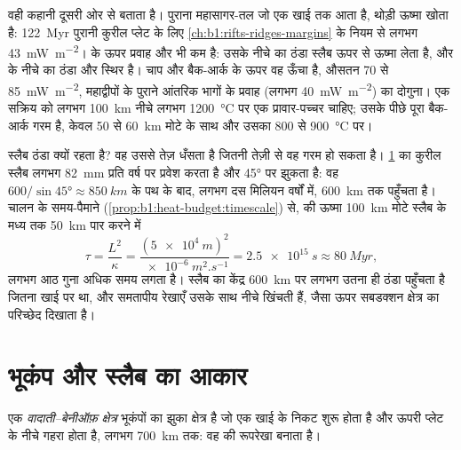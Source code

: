\begin{omfigure}
\label{fig:b1:active-margins:profiles}
\end{omfigure}

 वही कहानी दूसरी ओर से बताता है। पुराना महासागर-तल जो एक खाई तक आता है, थोड़ी ऊष्मा खोता है: \qty{122}{Myr} पुरानी कुरील प्लेट के लिए \cref{ch:b1:rifts-ridges-margins} के नियम से लगभग \qty{43}{mW.m^{-2}}।  के ऊपर प्रवाह और भी कम है: उसके नीचे का ठंडा स्लैब ऊपर से ऊष्मा लेता है, और  के नीचे का  ठंडा और स्थिर है। चाप और बैक-आर्क के ऊपर वह ऊँचा है, औसतन 70 से \qty{85}{mW.m^{-2}}, महाद्वीपों के पुराने आंतरिक भागों के प्रवाह (लगभग \qty{40}{mW.m^{-2}}) का दोगुना। एक सक्रिय  को लगभग \qty{100}{km} नीचे लगभग \qty{1200}{\celsius} पर एक प्रावार-पच्चर चाहिए; उसके पीछे पूरा बैक-आर्क गरम है, केवल 50 से \qty{60}{km} मोटे  के साथ और उसका  800 से \qty{900}{\celsius} पर।

स्लैब ठंडा क्यों रहता है? वह उससे तेज़ धँसता है जितनी तेज़ी से वह गरम हो सकता है। \cref{sec:b1:active-margins:seismicity} का कुरील स्लैब लगभग \qty{82}{mm} प्रति वर्ष पर प्रवेश करता है और \ang{45} पर झुकता है: वह $600/\sin\ang{45} \approx \qty{850}{km}$ के पथ के बाद, लगभग दस मिलियन वर्षों में, \qty{600}{km} तक पहुँचता है। चालन के समय-पैमाने (\cref{prop:b1:heat-budget:timescale}) से,  की ऊष्मा \qty{100}{km} मोटे स्लैब के मध्य तक \qty{50}{km} पार करने में
\[
  \tau = \frac{L^2}{\kappa} = \frac{(\qty{5e4}{m})^2}{\qty{e-6}{m^2.s^{-1}}}
  = \qty{2.5e15}{s} \approx \qty{80}{Myr},
\]
लगभग आठ गुना अधिक समय लगता है। स्लैब का केंद्र \qty{600}{km} पर लगभग उतना ही ठंडा पहुँचता है जितना खाई पर था, और समतापीय रेखाएँ उसके साथ नीचे खिंचती हैं, जैसा ऊपर सबडक्शन क्षेत्र का परिच्छेद दिखाता है।

\section{भूकंप और स्लैब का आकार}\label{sec:b1:active-margins:seismicity}

\begin{definition}[वादाती–बेनीऑफ़ क्षेत्र]\label{def:b1:active-margins:wadati-benioff}
एक \emph{वादाती–बेनीऑफ़ क्षेत्र} भूकंपों का झुका क्षेत्र है जो एक खाई के निकट शुरू होता है और ऊपरी प्लेट के नीचे गहरा होता है, लगभग \qty{700}{km} तक: वह  की रूपरेखा बनाता है।
\end{definition}

